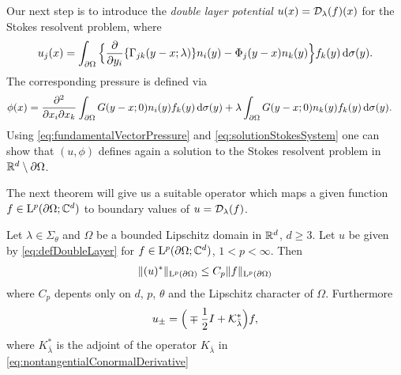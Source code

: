 Our next step is to introduce the \emph{double layer potential} $u(x) = \mathcal{D}_\lambda(f)(x)$ for the Stokes resolvent problem, where
\begin{align}
  \label{eq:defDoubleLayer}
  u_j(x) = \int_{\partial\Omega} \Big\{ \frac{\partial}{\partial y_i} \{ \Gamma_{jk}(y - x; \lambda) \} n_i(y) - \Phi_j(y - x) n_k(y) \Big\} f_k(y) \, {\operatorname{d}\!{\sigma}}(y).
\end{align}
The corresponding pressure is defined via
\begin{align}
  \label{eq:defDoubleLayerPressure}
  \phi(x)
  &= \frac{\partial^2}{\partial x_i \partial x_k} \int_{\partial\Omega} G(y - x; 0) n_i(y) f_k(y) \, {\operatorname{d}\!{\sigma}}(y) + \lambda \int_{\partial\Omega} G(y - x; 0) n_k(y) f_k(y) \, {\operatorname{d}\!{\sigma}}(y).
\end{align}
Using \ref{eq:fundamentalVectorPressure} and \ref{eq:solutionStokesSystem} one can show that $(u,\phi)$ defines again a solution to the Stokes resolvent problem in $\mathbb{R}^d \setminus \partial\Omega$.

The next theorem will give us a suitable operator which maps a given function $f \in \mathrm{L}^p(\partial\Omega; \mathbb{C}^d)$ to boundary values of $u = \mathcal{D}_\lambda(f)$.

\begin{thm}
Let $\lambda \in \Sigma_\theta$ and $\Omega$ be a bounded Lipschitz domain in $\mathbb{R}^d$, $d \geq 3$.
Let $u$ be given by \eqref{eq:defDoubleLayer} for $f \in \mathrm{L}^p(\partial\Omega; \mathbb{C}^d)$, $1 < p < \infty$.
Then
\begin{align*}
  \|(u)^*\|_{\mathrm{L}^p(\partial\Omega)} \leq C_p \|f\|_{\mathrm{L}^p(\partial\Omega)}
\end{align*}
where $C_p$ depents only on $d$, $p$, $\theta$ and the Lipschitz character of $\Omega$.
Furthermore 
\begin{align}
  \label{eq:nontangentialLimitDoubleLayer}
  u_\pm = \Big(\mp \frac{1}{2} I + \mathcal{K}_{\bar\lambda}^* \Big) f,
\end{align}
where $K_{\bar\lambda}^*$ is the adjoint of the operator $K_{\bar\lambda}$ in \eqref{eq:nontangentialConormalDerivative}
\end{thm}

